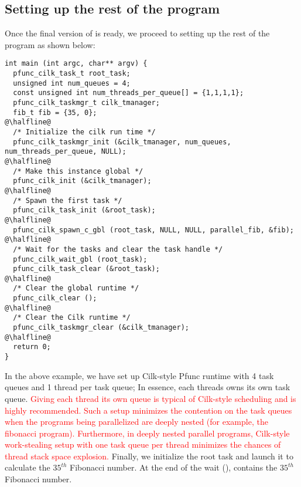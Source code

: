 \subsection{Setting up the rest of the program}
\label{subsec:fib_main}
%
Once the final version of  is ready, we proceed to setting
up the rest of the program as shown below:
%
\begin{lstlisting}
int main (int argc, char** argv) {
  pfunc_cilk_task_t root_task;
  unsigned int num_queues = 4;
  const unsigned int num_threads_per_queue[] = {1,1,1,1};
  pfunc_cilk_taskmgr_t cilk_tmanager;
  fib_t fib = {35, 0};
@\halfline@
  /* Initialize the cilk run time */
  pfunc_cilk_taskmgr_init (&cilk_tmanager, num_queues, num_threads_per_queue, NULL);
@\halfline@
  /* Make this instance global */
  pfunc_cilk_init (&cilk_tmanager);
@\halfline@
  /* Spawn the first task */
  pfunc_cilk_task_init (&root_task);
@\halfline@
  pfunc_cilk_spawn_c_gbl (root_task, NULL, NULL, parallel_fib, &fib);
@\halfline@
  /* Wait for the tasks and clear the task handle */
  pfunc_cilk_wait_gbl (root_task);
  pfunc_cilk_task_clear (&root_task);
@\halfline@
  /* Clear the global runtime */
  pfunc_cilk_clear ();
@\halfline@
  /* Clear the Cilk runtime */
  pfunc_cilk_taskmgr_clear (&cilk_tmanager);
@\halfline@
  return 0;
}
\end{lstlisting}
%
In the above example, we have set up Cilk-style Pfunc runtime with 4 task
queues and 1 thread per task queue; In essence, each threads owns its own task
queue. 
%
\textcolor{red}{Giving each thread its own queue is typical of Cilk-style
scheduling and is highly recommended. 
%
Such a setup minimizes the contention on the task queues when the programs
being parallelized are deeply nested (for example, the fibonacci program). 
%
Furthermore, in deeply nested parallel programs, Cilk-style work-stealing setup
with one task queue per thread minimizes the chances of thread stack space
explosion.} 
%
Finally, we initialize the root task and launch it to calculate the $35^{th}$
Fibonacci number. 
%
At the end of the wait (),  contains
the $35^{th}$ Fibonacci number.

